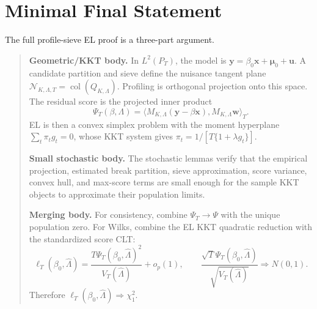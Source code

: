 \documentclass[12pt]{article}
\numberwithin{equation}{section}
\theoremstyle{definition}
\newcommand{\op}{o_p}
\newcommand{\N}{\mathcal N}
\newcommand{\LtwoT}{L^2(P_T)}
\newcommand{\innerT}[2]{\langle #1,#2\rangle_T}
\begin{document}
\section{Minimal Final Statement}

The full profile-sieve EL proof is a three-part argument.

\begin{quote}
\textbf{Geometric/KKT body.} In \(\LtwoT\), the model is
\(\bm y=\beta_0\bm x+\bm\mu_0+\bm u\). A candidate partition and sieve define the
nuisance tangent plane \(\N_{K,\Lambda,T}=\operatorname{col}(Q_{K,\Lambda})\).
Profiling is orthogonal projection onto this space. The residual score is the
projected inner product
\[
    \Psi_T(\beta,\Lambda)
    =\innerT{M_{K,\Lambda}(\bm y-\beta\bm x)}{M_{K,\Lambda}\bm w}.
\]
EL is then a convex simplex problem with the moment hyperplane
\(\sum_t\pi_tg_t=0\), whose KKT system gives
\(\pi_t=1/[T\{1+\lambda g_t\}]\).

\textbf{Small stochastic body.} The stochastic lemmas verify that the empirical
projection, estimated break partition, sieve approximation, score variance,
convex hull, and max-score terms are small enough for the sample KKT objects to
approximate their population limits.

\textbf{Merging body.} For consistency, combine
\(\Psi_T\to\Psi\) with the unique population zero. For Wilks, combine the EL KKT
quadratic reduction with the standardized score CLT:
\[
    \ell_T(\beta_0,\widehat\Lambda)
    =\frac{T\Psi_T(\beta_0,\widehat\Lambda)^2}{V_T(\widehat\Lambda)}+\op(1),
    \qquad
    \frac{\sqrt T\Psi_T(\beta_0,\widehat\Lambda)}
         {\sqrt{V_T(\widehat\Lambda)}}\Rightarrow N(0,1).
\]
Therefore \(\ell_T(\beta_0,\widehat\Lambda)\Rightarrow\chi_1^2\).
\end{quote}
\end{document}
